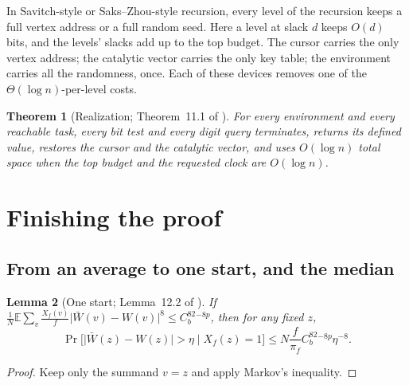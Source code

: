 \documentclass[11pt]{article}
\newtheorem{theorem}{Theorem}[section]
\newtheorem{lemma}[theorem]{Lemma}
\theoremstyle{definition}
\theoremstyle{remark}
\newcommand{\E}{\mathbb E}
\newcommand{\abs}[1]{\lvert #1\rvert}
\begin{document}
\begin{idea}
In Savitch-style or Saks--Zhou-style recursion, every level of the recursion keeps
a full vertex address or a full random seed. Here a level at slack $d$ keeps
$O(d)$ bits, and the levels' slacks add up to the top budget. The cursor carries
the only vertex address; the catalytic vector carries the only key table; the
environment carries all the randomness, once. Each of these devices removes one
of the $\Theta(\log n)$-per-level costs.
\end{idea}

\begin{theorem}[Realization; Theorem~11.1 of \cite{OpenAI-BPL}]\label{thm:realize}
For every environment and every reachable task, every bit test and every digit
query terminates, returns its defined value, restores the cursor and the
catalytic vector, and uses $O(\log n)$ total space when the top budget and the
requested clock are $O(\log n)$.
\end{theorem}

\section{Finishing the proof}\label{sec:finish}

\subsection{From an average to one start, and the median}

\begin{lemma}[One start; Lemma~12.2 of \cite{OpenAI-BPL}]\label{lem:onestart}
If $\frac1N\E\sum_v\frac{X_f(v)}f\abs{\bar W(v)-W(v)}^8\le C_b^82^{-8p}$, then for any fixed $z$,
\[
\Pr\bigl[\abs{\bar W(z)-W(z)}>\eta\mid X_f(z)=1\bigr]\le N\frac f{\pi_f}C_b^82^{-8p}\eta^{-8}.
\]
\end{lemma}

\begin{proof}
Keep only the summand $v=z$ and apply Markov's inequality.
\end{proof}
\end{document}
